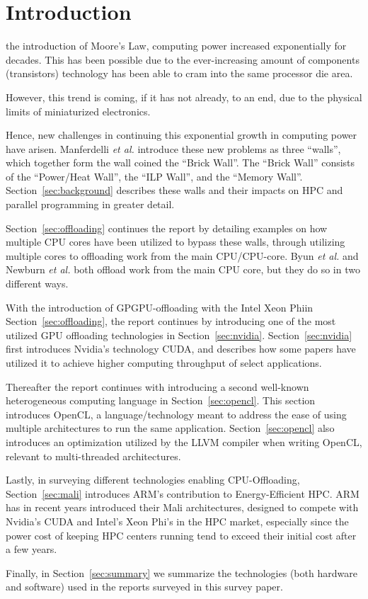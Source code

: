 
\section{Introduction}
\label{sec:intro}

 the introduction of Moore's Law\cite{Moore:2000:CMC:333067.333074}, computing power increased exponentially for decades.
This has been possible due to the ever-increasing amount of components (transistors) technology has been able to cram into the same processor die area.

However, this trend is coming, if it has not already, to an end, due to the physical limits of miniaturized electronics.

Hence, new challenges in continuing this exponential growth in computing power have arisen.
Manferdelli \textit{et al.}\cite{4484943} introduce these new problems as three ``walls'', which together form the wall coined the ``Brick Wall''.
The ``Brick Wall'' consists of the ``Power/Heat Wall'', the ``ILP Wall'', and the ``Memory Wall''.
Section~\ref{sec:background} describes these walls and their impacts on HPC and parallel programming in greater detail.

Section~\ref{sec:offloading} continues the report by detailing examples on how multiple CPU cores have been utilized to bypass these walls, through utilizing multiple cores to offloading work from the main CPU/CPU-core.
Byun \textit{et al.}\cite{Byun:EECS-2012-215} and Newburn \textit{et al.}\cite{Newburn:2013:OCR:2510648.2511038} both offload work from the main CPU core, but they do so in two different ways.

With the introduction of GPGPU-offloading with the Intel Xeon Phi\texttrademark in Section~\ref{sec:offloading}, the report continues by introducing one of the most utilized GPU offloading technologies in Section~\ref{sec:nvidia}.
Section~\ref{sec:nvidia} first introduces Nvidia's technology CUDA\texttrademark, and describes how some papers have utilized it to achieve higher computing throughput of select applications.

Thereafter the report continues with introducing a second well-known heterogeneous computing language in Section~\ref{sec:opencl}.
This section introduces OpenCL\texttrademark, a language/technology meant to address the ease of using multiple architectures to run the same application.
Section~\ref{sec:opencl} also introduces an optimization utilized by the LLVM compiler when writing OpenCL, relevant to multi-threaded architectures.

Lastly, in surveying different technologies enabling CPU-Offloading, Section~\ref{sec:mali} introduces ARM's contribution to Energy-Efficient HPC.
ARM has in recent years introduced their Mali architectures, designed to compete with Nvidia's CUDA and Intel's Xeon Phi's in the HPC market, especially since the power cost of keeping HPC centers running tend to exceed their initial cost after a few years.

Finally, in Section~\ref{sec:summary} we summarize the technologies (both hardware and software) used in the reports surveyed in this survey paper.
